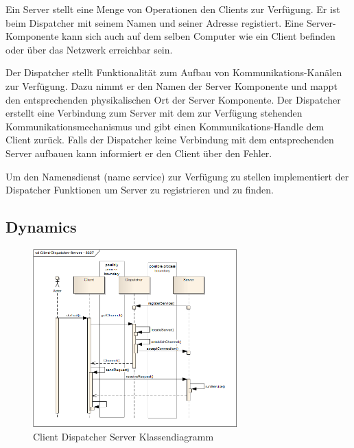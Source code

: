 Ein Server stellt eine Menge von Operationen den Clients zur Verfügung. Er ist beim Dispatcher mit seinem Namen und seiner Adresse registiert. Eine Server-Komponente kann sich auch auf dem selben Computer wie ein Client befinden oder über das Netzwerk erreichbar sein.

Der Dispatcher stellt Funktionalität zum Aufbau von Kommunikations-Kanälen zur Verfügung. Dazu nimmt er den Namen der Server Komponente und mappt den entsprechenden physikalischen Ort der Server Komponente. Der Dispatcher erstellt eine Verbindung zum Server mit dem zur Verfügung stehenden Kommunikationsmechanismus und gibt einen Kommunikations-Handle dem Client zurück. Falls der Dispatcher keine Verbindung mit dem entsprechenden Server aufbauen kann informiert er den Client über den Fehler.

Um den Namensdienst (name service) zur Verfügung zu stellen implementiert der Dispatcher Funktionen um Server zu registrieren und zu finden.

\subsection*{Dynamics}

\begin{figure}[H]
	\centering
	\includegraphics[width=0.7\textwidth]{content/posa1/images/client-dispatcher-server-sequence.png}
	\caption{Client Dispatcher Server Klassendiagramm}
\end{figure}

